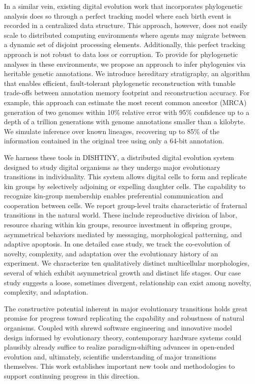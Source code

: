 In a similar vein, existing digital evolution work that incorporates phylogenetic analysis does so through a perfect tracking model where each birth event is recorded in a centralized data structure.
This approach, however, does not easily scale to distributed computing environments where agents may migrate between a dynamic set of disjoint processing elements.
Additionally, this perfect tracking approach is not robust to data loss or corruption.
To provide for phylogenetic analyses in these environments, we propose an approach to infer phylogenies via heritable genetic annotations.
We introduce hereditary stratigraphy, an algorithm that enables efficient, fault-tolerant phylogenetic reconstruction with tunable trade-offs between annotation memory footprint and reconstruction accuracy.
For example, this approach can estimate the most recent common ancestor (MRCA) generation of two genomes within 10\% relative error with 95\% confidence up to a depth of a trillion generations with genome annotations smaller than a kilobyte.
We simulate inference over known lineages, recovering up to 85\% of the information contained in the original tree using only a 64-bit annotation.

We harness these tools in DISHTINY, a distributed digital evolution system designed to study digital organisms as they undergo major evolutionary transitions in individuality.
This system allows digital cells to form and replicate kin groups by selectively adjoining or expelling daughter cells.
The capability to recognize kin-group membership enables preferential communication and cooperation between cells.
We report group-level traits characteristic of fraternal transitions in the natural world.
These include reproductive division of labor, resource sharing within kin groups, resource investment in offspring groups, asymmetrical behaviors mediated by messaging, morphological patterning, and adaptive apoptosis.
In one detailed case study, we track the co-evolution of novelty, complexity, and adaptation over the evolutionary history of an experiment.
We characterize ten qualitatively distinct multicellular morphologies, several of which exhibit asymmetrical growth and distinct life stages.
Our case study suggests a loose, sometimes divergent, relationship can exist among novelty, complexity, and adaptation.

The constructive potential inherent in major evolutionary transitions holds great promise for progress toward replicating the capability and robustness of natural organisms.
Coupled with shrewd software engineering and innovative model design informed by evolutionary theory, contemporary hardware systems could plausibly already suffice to realize paradigm-shifting advances in open-ended evolution and, ultimately, scientific understanding of major transitions themselves.
This work establishes important new tools and methodologies to support continuing progress in this direction.

